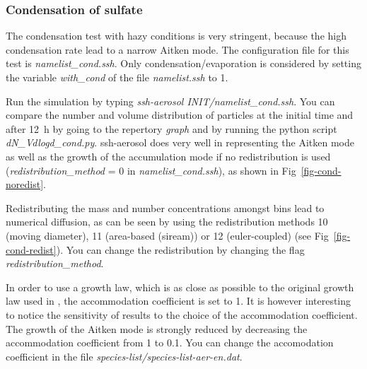 \documentclass[a4paper,11pt]{article}
\begin{document}
\subsubsection{Condensation of sulfate}
\label{cond-sulf}

The condensation test with hazy conditions is very stringent, because the high condensation
rate lead to a narrow Aitken mode.
The configuration file for this test is {\it{namelist\_cond.ssh}}.
Only condensation/evaporation is considered by setting the variable {\it{with\_cond}} of the file {\it{namelist.ssh}} to 1.

Run the simulation by typing {\it{ssh-aerosol INIT/namelist\_cond.ssh}}.
You can compare the number and volume distribution of particles at the initial
time and after 12~h by going to the repertory {\it{graph}} and by running the
python script {\it{dN\_Vdlogd\_cond.py}}.
ssh-aerosol does very well in representing
the Aitken mode as well as the growth of the accumulation mode if no
redistribution is used ({\it{redistribution\_method}} = 0 in
{\it{namelist\_cond.ssh}}), as shown in Fig~\ref{fig-cond-noredist}. 

Redistributing the mass and number concentrations
amongst bins lead to numerical diffusion, as can be seen by using the
redistribution methods 10 (moving diameter), 11 (area-based (siream)) or 12
(euler-coupled) (see Fig~\ref{fig-cond-redist}).
You can change the redistribution by changing the flag {\it{redistribution\_method}}.

In order to use a growth law, which is as close as possible to the original growth law
used in \cite{zhang1999simulation} , the accommodation coefficient is set to 1. It is however interesting
to notice the sensitivity of results to the choice of the accommodation coefficient. 
The growth of the Aitken mode is strongly reduced by decreasing the
accommodation coefficient from 1 to 0.1.
You can change the accomodation coefficient in the file {\it{species-list/species-list-aer-en.dat}}.
\end{document}
